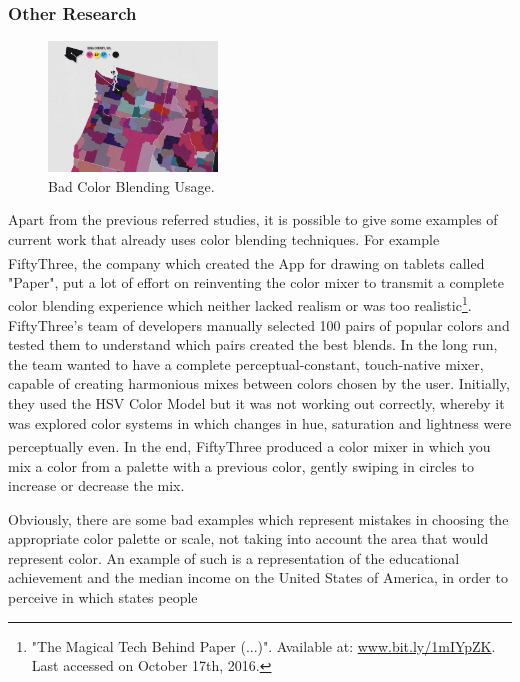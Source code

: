 \subsubsection{Other Research}
\label{subsubsec:other_research}
%
\begin{figure}
	\centering
    \vspace{-10pt}
    \includegraphics[width=0.4\textwidth]{images/background/CMYKbad.png}
    \caption[Color Blending: CMYK Bad Example]{Bad Color Blending Usage.\protect\footnotemark[19]}
    \label{fig:cmykbad}
\end{figure}
%
Apart from the previous referred studies, it is possible to give some
examples of current work that already uses color blending techniques. For example FiftyThree\textsuperscript{\textregistered},
the company which created the App for drawing on tablets called "Paper", put a lot of effort on reinventing the color mixer to
transmit a complete color blending experience which neither lacked realism or was too realistic\footnote{"The Magical Tech
Behind Paper (...)". Available at: \url{www.bit.ly/1mIYpZK}. Last accessed on October 17th, 2016.}. FiftyThree's team
of developers manually selected 100 pairs of popular colors and tested them to understand which pairs created the
best blends. In the long run, the team wanted to have a complete perceptual-constant, touch-native mixer, capable of
creating harmonious mixes between colors chosen by the user. Initially, they used the HSV Color Model but it was not
working out correctly, whereby it was explored color systems in which changes in hue, saturation and lightness were
perceptually even. In the end, FiftyThree\textsuperscript{\textregistered} produced a color mixer in which you mix
a color from a palette with a previous color, gently swiping in circles to increase or decrease the mix.\par
%
Obviously, there are some bad examples which represent mistakes in choosing the appropriate color palette or scale,
not taking into account the area that would represent color. An example of such is a representation of the
educational achievement and the median income on the United States of America, in order to perceive in which states people
